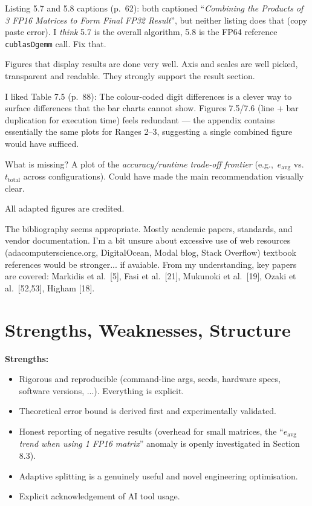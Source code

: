 \documentclass[11pt,a4paper]{article}
\newcommand{\q}[1]{``\textit{#1}''}
\newcommand{\pg}[1]{(p.~#1)}
\begin{document}
Listing 5.7 and 5.8 captions \pg{62}: both captioned \q{Combining the Products of 3 FP16 Matrices to Form Final FP32 Result},
but neither listing does that (copy paste error).
I \emph{think} 5.7 is the overall algorithm, 5.8 is the FP64 reference \texttt{cublasDgemm} call. Fix that.

Figures that display results are done very well.
Axis and scales are well picked, transparent and readable.
They strongly support the result section.

I liked Table 7.5 \pg{88}: The colour-coded digit differences is a clever way to surface differences that the bar charts cannot show.
Figures 7.5/7.6 (line + bar duplication for execution time) feels redundant --- the appendix contains essentially the same plots for Ranges 2--3, suggesting a single combined figure would have sufficed.

What is missing?
A plot of the \emph{accuracy/runtime trade-off frontier} (e.g.,~$e_{\text{avg}}$ vs.~$t_{\text{total}}$ across configurations).
Could have made the main recommendation visually clear.

All adapted figures are credited.

The bibliography seems appropriate.
Mostly academic papers, standards, and vendor documentation.
I'm a bit unsure about excessive use of web resources (adacomputerscience.org, DigitalOcean, Modal blog, Stack Overflow)
textbook references would be stronger... if avaiable.
From my understanding, key papers are covered: Markidis et al.~[5], Fasi et al.~[21], Mukunoki et al.~[19], Ozaki et al.~[52,53], Higham [18].

\section{Strengths, Weaknesses, Structure}

\textbf{Strengths:}
\begin{itemize}
  \item Rigorous and reproducible (command-line args, seeds, hardware specs, software versions, ...). Everything is explicit.
  \item Theoretical error bound is derived first and experimentally validated.
  \item Honest reporting of negative results (overhead for small matrices, the \q{$e_{\text{avg}}$ trend when using 1 FP16 matrix} anomaly is openly investigated in Section 8.3).
  \item Adaptive splitting is a genuinely useful and novel engineering optimisation.
  \item Explicit acknowledgement of AI tool usage.
\end{itemize}
\end{document}
